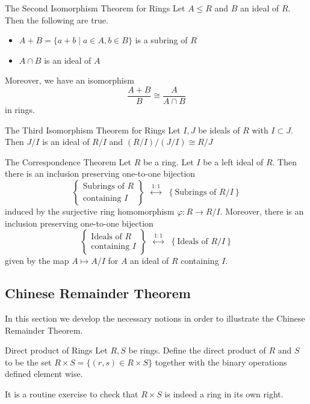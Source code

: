 \documentclass[a4paper]{article}
\begin{document}
\begin{thm}{The Second Isomorphism Theorem for Rings}{} Let $A\leq R$ and $B$ an ideal of $R$. Then the following are true. 
\begin{itemize}
\item $A+B=\{a+b\;|\;a\in A,b\in B\}$ is a subring of $R$
\item $A\cap B$ is an ideal of $A$
\end{itemize}
Moreover, we have an isomorphism $$\frac{A+B}{B}\cong\frac{A}{A\cap B}$$ in rings. 
\end{thm}

\begin{thm}{The Third Isomorphism Theorem for Rings}{} Let $I,J$ be ideals of $R$ with $I\subset J$. Then $J/I$ is an ideal of $R/I$ and $(R/I)/(J/I)\cong R/J$
\end{thm}

\begin{thm}{The Correspondence Theorem}{} Let $R$ be a ring. Let $I$ be a left ideal of $R$. Then there is an inclusion preserving one-to-one bijection $$\left\{\substack{\text{Subrings of }R\\\text{containing }I}\right\}\;\;\overset{1:1}{\longleftrightarrow}\;\;\left\{\text{Subrings of }R/I\right\}$$ induced by the surjective ring homomorphism $\varphi:R\to R/I$. Moreover, there is an inclusion preserving one-to-one bijection $$\left\{\substack{\text{Ideals of }R\\\text{containing }I}\right\}\;\;\overset{1:1}{\longleftrightarrow}\;\;\left\{\text{Ideals of }R/I\right\}$$ given by the map $A\mapsto A/I$ for $A$ an ideal of $R$ containing $I$. 
\end{thm}

\subsection{Chinese Remainder Theorem}
In this section we develop the necessary notions in order to illustrate the Chinese Remainder Theorem. 

\begin{defn}{Direct product of Rings}{} Let $R,S$ be rings. Define the direct product of $R$ and $S$ to be the set $R\times S=\{(r,s)\in R\times S\}$ together with the binary operations defined element wise. 
\end{defn}

It is a routine exercise to check that $R\times S$ is indeed a ring in its own right. \\~\\
\end{document}
